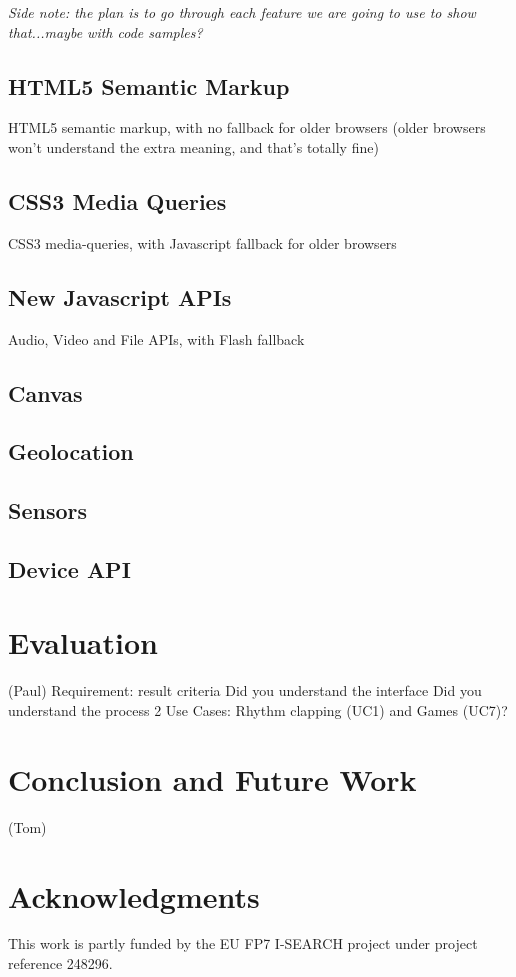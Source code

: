 \documentclass[runningheads,a4paper]{llncs}
\begin{document}
\emph{Side note: the plan is to go through each feature we are going to use to show that...maybe with code samples?}

\subsection{HTML5 Semantic Markup} 

HTML5 semantic markup, with no fallback for older browsers (older browsers won't understand the extra meaning, and that's totally fine)

\subsection{CSS3 Media Queries} 

CSS3 media-queries, with Javascript fallback for older browsers

\subsection{New Javascript APIs}

 Audio, Video and File APIs, with Flash fallback

\subsection{Canvas}

\subsection{Geolocation}

\subsection{Sensors}

\subsection{Device API}


\section{Evaluation}
(Paul)
Requirement: result criteria
Did you understand the interface
Did you understand the process
2 Use Cases: Rhythm clapping (UC1) and Games (UC7)?

\section{Conclusion and Future Work}
(Tom)

\section{Acknowledgments}
This work is partly funded by the EU FP7 I-SEARCH project under project reference 248296.



\end{document}
